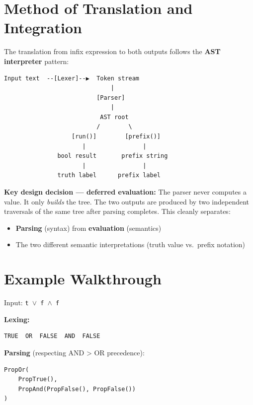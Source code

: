 \documentclass[12pt,a4paper]{article}
\begin{document}
\section{Method of Translation and Integration}

The translation from infix expression to both outputs follows the \textbf{AST
interpreter} pattern:

\begin{lstlisting}
Input text  --[Lexer]--▶  Token stream
                              |
                          [Parser]
                              |
                           AST root
                          /        \
                   [run()]        [prefix()]
                      |                |
               bool result       prefix string
                      |                |
               truth label      prefix label
\end{lstlisting}

\textbf{Key design decision --- deferred evaluation:} The parser never computes a
value. It only \emph{builds} the tree. The two outputs are produced by two
independent traversals of the same tree after parsing completes. This cleanly
separates:

\begin{itemize}
    \item \textbf{Parsing} (syntax) from \textbf{evaluation} (semantics)
    \item The two different semantic interpretations (truth value vs.\ prefix notation)
\end{itemize}

\section{Example Walkthrough}

Input: \texttt{t $\lor$ f $\land$ f}

\textbf{Lexing:}

\begin{lstlisting}
TRUE  OR  FALSE  AND  FALSE
\end{lstlisting}

\textbf{Parsing} (respecting AND > OR precedence):

\begin{lstlisting}[language=Python]
PropOr(
    PropTrue(),
    PropAnd(PropFalse(), PropFalse())
)
\end{lstlisting}
\end{document}
